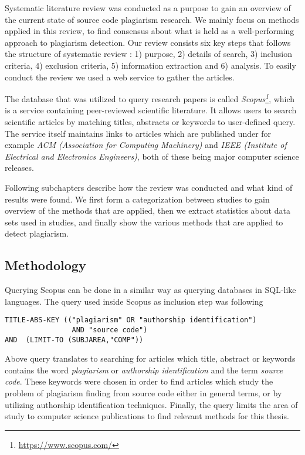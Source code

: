 Systematic literature review was conducted as a purpose to gain an overview of the current state of source code plagiarism research. We mainly focus on methods applied in this review, to find consensus about what is held as a well-performing approach to plagiarism detection. Our review consists six key steps that follows the structure of systematic review \cite{AGCSLRIS2010}: 1) purpose, 2) details of search, 3) inclusion criteria, 4) exclusion criteria, 5) information extraction and 6) analysis. To easily conduct the review we used a web service to gather the articles.


The database that was utilized to query research papers is called \emph{Scopus\footnote{\url{https://www.scopus.com/}}}, which is a service containing peer-reviewed scientific literature. It allows users to search scientific articles by matching \eg titles, abstracts or keywords to user-defined query. The service itself maintains links to articles which are published under for example \emph{ACM (Association for Computing Machinery)} and \emph{IEEE (Institute of Electrical and Electronics Engineers)}, both of these being major computer science releases. 

Following subchapters describe how the review was conducted and what kind of results were found. We first form a categorization between studies to gain overview of the methods that are applied, then we extract statistics about data sets used in studies, and finally show the various methods that are applied to detect plagiarism. 

\subsection{Methodology}

Querying Scopus can be done in a similar way as querying databases in SQL-like languages. The query used inside Scopus as inclusion step was following
\begin{verbatim}
TITLE-ABS-KEY (("plagiarism" OR "authorship identification")  
                AND "source code") 
AND  (LIMIT-TO (SUBJAREA,"COMP"))
\end{verbatim}

\noindent
Above query translates to searching for articles which title, abstract or keywords contains the word \emph{plagiarism} or \emph{authorship identification} and the term \emph{source code}. These keywords were chosen in order to find articles which study the problem of plagiarism finding from source code either in general terms, or by utilizing authorship identification techniques. Finally, the query limits the area of study to computer science publications to find relevant methods for this thesis. 

